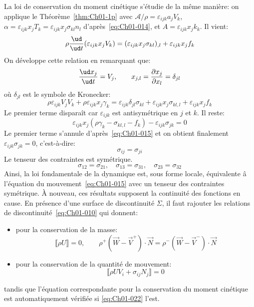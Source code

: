 La loi de conservation du moment cinétique s'étudie de la même manière: on applique le Théorème~\ref{thm:Ch01-1p} avec $\mathcal{A}/\rho=\varepsilon_{ijk}a_jV_k$, $\alpha=\varepsilon_{ijk}x_jT_k=\varepsilon_{ijk}x_j\sigma_{kl}n_l$ d'après~\eqref{eq:Ch01-014}, et $A=\varepsilon_{ijk}x_jk_k$.
Il vient:
\begin{equation*}
    \rho \frac{\ud}{\ud t}(\varepsilon_{ijk}x_jV_k)=(\varepsilon_{ijk}x_j\sigma_{kl})_{,l}+\varepsilon_{ijk}x_jf_k
\end{equation*}
On développe cette relation en remarquant que:
\begin{equation*}
    \frac{\ud x_j}{\ud t}=V_j, \qquad x_{j,l}=\frac{\partial x_j}{\partial x_l}=\delta_{jl}
\end{equation*}
où $\delta_{jl}$ est le symbole de Kronecker:
\begin{equation*}
    \rho \varepsilon_{ijk}V_jV_k+\rho\varepsilon_{ijk}x_j\gamma_k=\varepsilon_{ijk}\delta_{jl}\sigma_{kl}+\varepsilon_{ijk}x_j\sigma_{kl,l}+ \varepsilon_{ijk}x_jf_k
\end{equation*}
Le premier terme disparaît car $\varepsilon_{ijk}$ est antisymétrique en $j$ et $k$.
Il reste:
\begin{equation*} 
    \varepsilon_{ijk}x_j(\rho\gamma_k-\sigma_{kl,l}-f_k)-\varepsilon_{ijk}\sigma_{jk}=0
\end{equation*}
Le premier terme s'annule d'après~\eqref{eq:Ch01-015} et on obtient finalement $\varepsilon_{ijk}\sigma_{jk}=0$, c'est-à-dire:
\begin{equation}
    \sigma_{ij}=\sigma_{ji}
    \label{eq:Ch01-019}
\end{equation}
Le tenseur des contraintes est symétrique.
\begin{displaymath}
    \sigma_{12} = \sigma_{21}, \quad \sigma_{13}= \sigma_{31}, \quad \sigma_{23} = \sigma_{32}
\end{displaymath}
Ainsi, la loi fondamentale de la dynamique est, sous forme locale, équivalente â l'équation du mouvement~\eqref{eq:Ch01-015} avec un tenseur des contraintes symétrique.
À nouveau, ces résultats supposent la continuité des fonctions en cause.
En présence d'une surface de discontinuité $\Sigma$, il faut rajouter les relations de discontinuité~\eqref{eq:Ch01-010} qui donnent:
\begin{itemize}
     \item pour la conservation de la masse:
        \begin{equation}
            \llbracket \rho U \rrbracket=0, \qquad \rho^+(\vec{W}-\vec{V}^+)\cdot \vec{N} =\rho^-(\vec{W}-\vec{V}^-)\cdot \vec{N}
            \label{eq:Ch01-020}
        \end{equation}
    \item pour la conservation de la quantité de mouvement:
    \begin{equation}
        \llbracket \rho U V_i +\sigma_{ij}N_j \rrbracket=0
        \label{eq:Ch01-021}
    \end{equation}
\end{itemize}
tandis que l'équation correspondante pour la conservation du moment cinétique est automatiquement vérifiée si \eqref{eq:Ch01-022} l'est.

